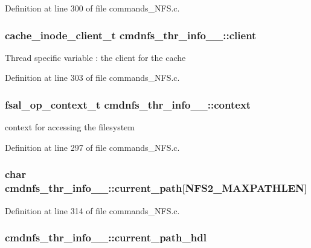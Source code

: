Definition at line 300 of file commands\_\-NFS.c.
\subsubsection[{client}]{\setlength{\rightskip}{0pt plus 5cm}cache\_\-inode\_\-client\_\-t {\bf cmdnfs\_\-thr\_\-info\_\-\_\-::client}}\label{structcmdnfs__thr__info_____f89ea305c75cfe698a4b6c70d4ee4cae}


Thread specific variable : the client for the cache 

Definition at line 303 of file commands\_\-NFS.c.
\subsubsection[{context}]{\setlength{\rightskip}{0pt plus 5cm}fsal\_\-op\_\-context\_\-t {\bf cmdnfs\_\-thr\_\-info\_\-\_\-::context}}\label{structcmdnfs__thr__info_____b62a259165636bd5465e7c3fee498d9b}


context for accessing the filesystem 

Definition at line 297 of file commands\_\-NFS.c.
\subsubsection[{current\_\-path}]{\setlength{\rightskip}{0pt plus 5cm}char {\bf cmdnfs\_\-thr\_\-info\_\-\_\-::current\_\-path}[NFS2\_\-MAXPATHLEN]}\label{structcmdnfs__thr__info_____9451e8684496cc62edd93d3fbf2e4193}




Definition at line 314 of file commands\_\-NFS.c.
\subsubsection[{current\_\-path\_\-hdl}]{ {\bf cmdnfs\_\-thr\_\-info\_\-\_\-::current\_\-path\_\-hdl}}\label{structcmdnfs__thr__info_____6a7906ceebad98937b2e0adac31a75a0}





